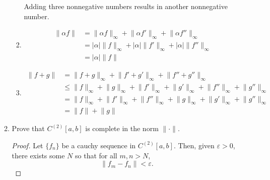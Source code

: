 \documentclass{article}
\begin{document}
\begin{enumerate}
\begin{enumerate}
\begin{enumerate}
                                    Adding three nonnegative numbers results in another
                                    nonnegative number.
                              \item \begin{align*}
                                          \lVert \alpha f\rVert & = \lVert\alpha f\rVert_\infty + \lVert\alpha f'\rVert_\infty + \lVert\alpha f''\rVert_\infty                                     \\
                                                                & = \lvert\alpha\rvert\lVert f\rVert_\infty + \lvert\alpha\rvert\lVert f'\rVert_\infty + \lvert\alpha\rvert\lVert f''\rVert_\infty \\
                                                                & = \lvert\alpha\rvert\lVert f\rVert
                                    \end{align*}
                              \item \begin{align*}
                                          \lVert f+g\rVert & = \lVert f+g\rVert_\infty + \lVert f'+g'\rVert_\infty + \lVert f''+g''\rVert_\infty                                                                   \\
                                                           & \leq \lVert f\rVert_\infty+\lVert g\rVert_\infty + \lVert f'\rVert_\infty+\lVert g'\rVert_\infty + \lVert f''\rVert_\infty+\lVert g''\rVert_\infty    \\
                                                           & = \lVert f\rVert_\infty + \lVert f'\rVert_\infty + \lVert f''\rVert_\infty + \lVert g\rVert_\infty + \lVert g'\rVert_\infty + \lVert g''\rVert_\infty \\
                                                           & = \lVert f\rVert + \lVert g\rVert
                                    \end{align*}
                        \end{enumerate}
                  \item Prove that $C^{(2)}[a,b]$ is complete in the norm
                        $\lVert\cdot\rVert$.
                        \begin{proof}
                              Let $\{f_n\}$ be a cauchy sequence in $C^{(2)}[a,b]$. Then,
                              given $\varepsilon>0$, there exists some $N$ so that
                              for all $m,n>N$,
                              \[
                                    \lVert f_m-f_n\rVert < \varepsilon.
\]
\end{proof}
\end{enumerate}
\end{enumerate}
\end{document}
